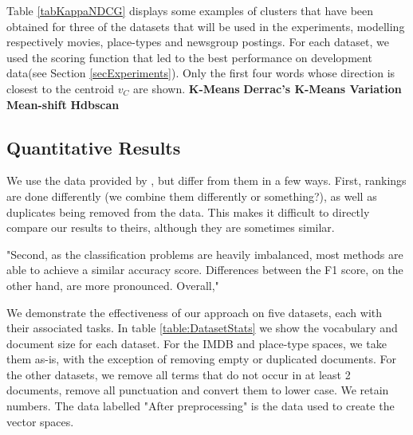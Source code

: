 Table \ref{tabKappaNDCG} displays some examples of clusters that have been obtained for three of the datasets that will be used in the experiments, modelling respectively movies, place-types and newsgroup postings. For each dataset, we used the scoring function that led to the best performance on development data(see Section \ref{secExperiments}). Only the first four words whose direction is closest to the centroid $v_C$ are shown.
\noindent \textbf{K-Means}
\noindent \textbf{Derrac's K-Means Variation}
\noindent \textbf{Mean-shift}
\noindent \textbf{Hdbscan}



\subsection{Quantitative Results}
We use the data provided by \cite{Derrac2015}, but differ from them in a few ways. First, rankings are done differently (we combine them differently or something?), as well as duplicates being removed from the data. This makes it difficult to directly compare our results to theirs, although they are sometimes similar.

"Second, as the classification problems are heavily imbalanced, most methods are able to achieve a similar accuracy score. Differences between the F1 score, on the other hand, are more pronounced. Overall," \cite{Derrac2015}

We demonstrate the effectiveness of our approach on five datasets, each with their associated tasks. In table \ref{table:DatasetStats} we show the vocabulary and document size for each dataset. For the IMDB and place-type spaces, we take them as-is, with the exception of removing empty or duplicated documents. For the other datasets, we remove all terms that do not occur in at least 2 documents, remove all punctuation and convert them to lower case. We retain numbers. The data labelled "After preprocessing" is the data used to create the vector spaces. 

